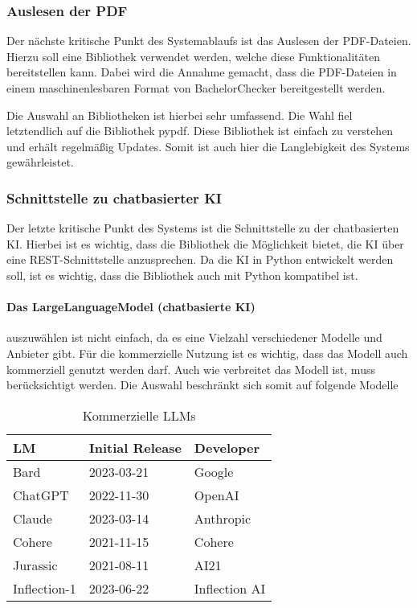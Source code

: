 \subsubsection{Auslesen der PDF}\label{subsubsec:pdf}
Der nächste kritische Punkt des Systemablaufs ist das Auslesen der PDF-Dateien.
Hierzu soll eine Bibliothek verwendet werden, welche diese Funktionalitäten bereitstellen kann.
Dabei wird die Annahme gemacht, dass die PDF-Dateien in einem maschinenlesbaren Format von BachelorChecker bereitgestellt werden.

Die Auswahl an Bibliotheken ist hierbei sehr umfassend.
Die Wahl fiel letztendlich auf die Bibliothek pypdf.
Diese Bibliothek ist einfach zu verstehen und erhält regelmäßig Updates.
Somit ist auch hier die Langlebigkeit des Systems gewährleistet.

\subsubsection{Schnittstelle zu chatbasierter KI}\label{subsubsec:ki}
Der letzte kritische Punkt des Systems ist die Schnittstelle zu der chatbasierten KI.
Hierbei ist es wichtig, dass die Bibliothek die Möglichkeit bietet, die KI über eine REST-Schnittstelle anzusprechen.
Da die KI in Python entwickelt werden soll, ist es wichtig, dass die Bibliothek auch mit Python kompatibel ist.

\paragraph{Das LargeLanguageModel (chatbasierte KI)} auszuwählen ist nicht einfach,
da es eine Vielzahl verschiedener Modelle und Anbieter gibt.
Für die kommerzielle Nutzung ist es wichtig, dass das Modell auch kommerziell genutzt werden darf.
Auch wie verbreitet das Modell ist, muss berücksichtigt werden.
Die Auswahl beschränkt sich somit auf folgende Modelle

\begin{table}[H]
    \begin{tabularx}{\textwidth}{lll}
        \toprule
        \textbf{LM}  & \textbf{Initial Release} & \textbf{Developer} \\
        \midrule
        Bard         & 2023-03-21               & Google             \\
        ChatGPT      & 2022-11-30               & OpenAI             \\
        Claude       & 2023-03-14               & Anthropic          \\
        Cohere       & 2021-11-15               & Cohere             \\
        Jurassic     & 2021-08-11               & AI21               \\
        Inflection-1 & 2023-06-22               & Inflection AI      \\
        \bottomrule
    \end{tabularx}
    \caption{Kommerzielle LLMs}\autocite{sapling.llmindex}
    \label{tab:kommerzielle-llms}
\end{table}

